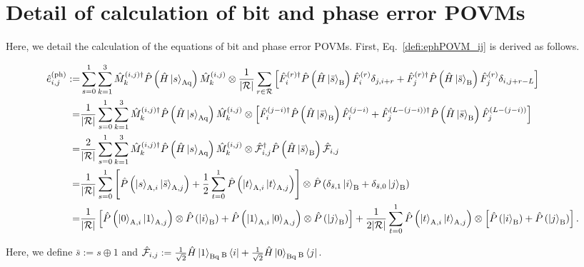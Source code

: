 \documentclass[twocolumn,superscriptaddress,pra,footinbib,notitlepage]{revtex4-1}
\newcommand{\1}{\mbox{1}\hspace{-0.25em}\mbox{l}}
\newcommand{\abs}[1]{\lvert#1\rvert}
\begin{document}
\section{Detail of calculation of bit and phase error POVMs} 
\label{append:bit-phase-error-POVMs}
Here, we detail the calculation of the equations of bit and phase error POVMs. First, Eq.~\eqref{defi:ephPOVM_ij} is derived as follows.
\begin{widetext}
\begin{align}
\hat{e}_{i, j}^{(\textrm{ph})}:=&\sum_{s=0}^1\sum_{k=1}^3\hat{M}_k^{(i, j)\dagger}\hat{P}\left(\hat{H}\ket{s}_\textrm{Aq}\right)\hat{M}_k^{(i, j)}\otimes\frac{1}{\abs{\mathcal{R}}}\sum_{r\in\mathcal{R}}\left[\hat{F}_i^{(r)\dagger}\hat{P}\left(\hat{H}\ket{\bar{s}}_\textrm{B}\right)\hat{F}_i^{(r)}\delta_{j, i+r}+\hat{F}_j^{(r)\dagger}\hat{P}\left(\hat{H}\ket{\bar{s}}_\textrm{B}\right)\hat{F}_j^{(r)}\delta_{i, j+r-L}\right]\nonumber\\
=&\frac{1}{\abs{\mathcal{R}}}\sum_{s=0}^1\sum_{k=1}^3\hat{M}_k^{(i, j)\dagger}\hat{P}\left(\hat{H}\ket{s}_\textrm{Aq}\right)\hat{M}_k^{(i, j)}\otimes\left[\hat{F}_i^{(j-i)\dagger}\hat{P}\left(\hat{H}\ket{\bar{s}}_\textrm{B}\right)\hat{F}_i^{(j-i)}+\hat{F}_j^{(L-(j-i))\dagger}\hat{P}\left(\hat{H}\ket{\bar{s}}_\textrm{B}\right)\hat{F}_j^{(L-(j-i))}\right]\nonumber\\
=&\frac{2}{\abs{\mathcal{R}}}\sum_{s=0}^1\sum_{k=1}^3\hat{M}_k^{(i, j)\dagger}\hat{P}\left(\hat{H}\ket{s}_\textrm{Aq}\right)\hat{M}_k^{(i, j)}\otimes\hat{\mathcal{F}}_{i, j}^{\dagger}\hat{P}\left(\hat{H}\ket{\bar{s}}_\textrm{B}\right)\hat{\mathcal{F}}_{i, j}\nonumber\\
=&\frac{1}{\abs{\mathcal{R}}}\sum_{s=0}^1\left[\hat{P}\left(\ket{s}_{\textrm{A}, i}\ket{\bar{s}}_{\textrm{A}, j}\right)+\frac{1}{2}\sum_{t=0}^1\hat{P}\left(\ket{t}_{\textrm{A}, i}\ket{t}_{\textrm{A}, j}\right)\right]\otimes\hat{P}\left(\delta_{\bar{s},1}\ket{i}_\textrm{B}+\delta_{\bar{s}, 0}\ket{j}_\textrm{B}\right)\nonumber\\
=&\frac{1}{\abs{\mathcal{R}}}\left[\hat{P}\left(\ket{0}_{\textrm{A}, i}\ket{1}_{\textrm{A}, j}\right)\otimes\hat{P}\left(\ket{i}_\textrm{B}\right)+\hat{P}\left(\ket{1}_{\textrm{A}, i}\ket{0}_{\textrm{A}, j}\right)\otimes\hat{P}\left(\ket{j}_\textrm{B}\right)\right]+\frac{1}{2\abs{\mathcal{R}}}\sum_{t=0}^1\hat{P}\left(\ket{t}_{\textrm{A}, i}\ket{t}_{\textrm{A}, j}\right)\otimes\left[\hat{P}\left(\ket{i}_\textrm{B}\right)+\hat{P}\left(\ket{j}_\textrm{B}\right)\right].
\end{align}
\end{widetext}
Here, we define $\bar{s}:=s\oplus1$ and $\hat{\mathcal{F}}_{i, j}:=\frac{1}{\sqrt{2}}\hat{H}\ket{1}_\textrm{Bq}{}_\textrm{B}\bra{i}+\frac{1}{\sqrt{2}}\hat{H}\ket{0}_\textrm{Bq}{}_\textrm{B}\bra{j}$.
\end{document}
